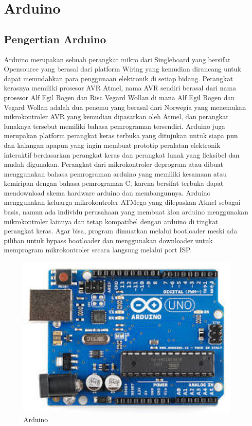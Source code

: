 \section{Arduino}
\subsection{Pengertian Arduino}
Arduino merupakan sebuah perangkat mikro dari Singleboard yang bersifat Opensource yang berasal dari platform Wiring yang kemudian dirancang untuk dapat memudahkan para penggunaan elektronik di setiap bidang. Perangkat kerasnya memiliki prosesor AVR Atmel, nama AVR sendiri berasal dari nama prosesor Alf Egil Bogen dan Risc Vegard Wollan di mana Alf Egil Bogen dan Vegard Wollan adalah dua penemu yang berasal dari Norwegia yang menemukan mikrokontroler AVR yang kemudian dipasarkan oleh Atmel, dan perangkat lunaknya tersebut memiliki bahasa pemrograman tersendiri. 
Arduino juga merupakan platform perangkat keras terbuka yang ditujukan untuk siapa pun dan kalangan apapun yang ingin membuat prototip peralatan elektronik interaktif berdasarkan perangkat keras dan perangkat lunak yang fleksibel dan mudah digunakan. Perangkat dari mikrokontroler deprogram atau dibuat menggunakan bahasa pemrograman arduino yang memiliki kesamaan atau kemiripan dengan bahasa pemrograman C, karena bersifat terbuka dapat mendownload skema hardware arduino dan membangunnya. 
Arduino menggunakan keluarga mikrokontroler ATMega yang dilepaskan Atmel sebagai basis, namun ada individu perusahaan yang membuat klon arduino menggunakan mikrokontroler lainnya dan tetap kompatibel dengan arduino di tingkat perangkat keras. Agar bisa, program dimuatkan melalui bootloader meski ada pilihan untuk bypass bootloader dan menggunakan downloader untuk memprogram mikrokontroler secara langsung melalui port ISP.

\begin{figure}[ht]
	\centerline{\includegraphics[width=1\textwidth]{figures/arduino.jpg}}
	\caption{Arduino}
	\label{Arduino}
	\end{figure}

